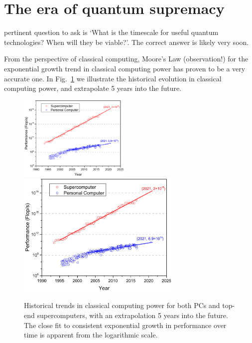 \section{The era of quantum supremacy} \label{sec:era_quant} 

\newline

 pertinent question to ask is `What is the timescale for useful quantum technologies? When will they be viable?'. The correct answer is likely very soon.

From the perspective of classical computing, Moore's Law (observation!) for the exponential growth trend in classical computing power has proven to be a very accurate one. In Fig.~\ref{fig:moores_law} we illustrate the historical evolution in classical computing power, and extrapolate 5 years into the future.

\begin{figure}[!htbp]
\doublecol
	\includegraphics[clip=true, width=0.475\textwidth]{moores_law}
\else
	\includegraphics[clip=true, width=0.7\textwidth]{moores_law}
\fi
\captionspacefig \caption{Historical trends in classical computing power for both PCs and top-end supercomputers, with an extrapolation 5 years into the future. The close fit to consistent exponential growth in performance over time is apparent from the logarithmic scale.} \label{fig:moores_law}
\end{figure}

